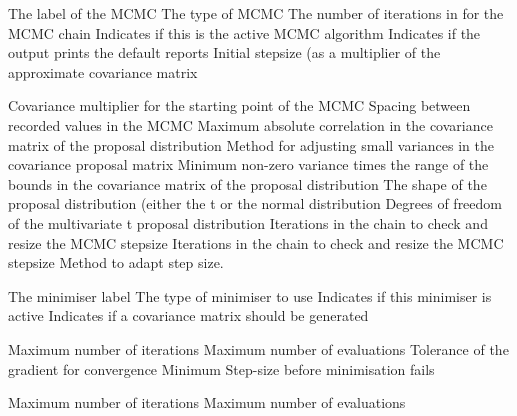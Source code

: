 \par\par
{} {The label of the MCMC}
 {The type of MCMC}
 {The number of iterations in for the MCMC chain}
 {Indicates if this is the active MCMC algorithm}
 {Indicates if the output prints the default reports}
 {Initial stepsize (as a multiplier of the approximate covariance matrix}
\par\textbf{}\par
{} {Covariance multiplier for the starting point of the MCMC}
 {Spacing between recorded values in the MCMC}
 {Maximum absolute correlation in the covariance matrix of the proposal distribution}
 {Method for adjusting small variances in the covariance proposal matrix}
 {Minimum non-zero variance times the range of the bounds in the covariance matrix of the proposal distribution}
 {The shape of the proposal distribution (either the t or the normal distribution}
 {Degrees of freedom of the multivariate t proposal distribution}
 {Iterations in the chain to check and resize the MCMC stepsize}
 {Iterations in the chain to check and resize the MCMC stepsize}
 {Method to adapt step size.}
\par\par
{} {The minimiser label}
 {The type of minimiser to use}
 {Indicates if this minimiser is active}
 {Indicates if a covariance matrix should be generated}
\par\textbf{}\par
{} {Maximum number of iterations}
 {Maximum number of evaluations}
 {Tolerance of the gradient for convergence}
 {Minimum Step-size before minimisation fails}
\par\textbf{}\par
{} {Maximum number of iterations}
 {Maximum number of evaluations}
